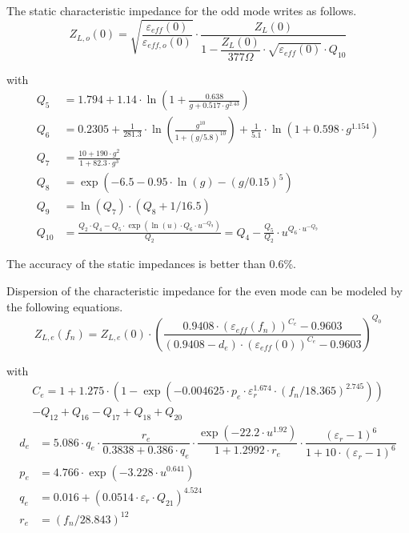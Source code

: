 \documentclass[10pt]{report}
\begin{document}
\addvspace{12pt}

The static characteristic impedance for the odd mode writes as follows.
\begin{equation}
Z_{L,o}(0) = \sqrt{\dfrac{\varepsilon_{eff}(0)}{\varepsilon_{eff,o}(0)}} \cdot
             \dfrac{Z_L(0)}{1 - \dfrac{Z_L(0)}{377\Omega} \cdot \sqrt{\varepsilon_{eff}(0)} \cdot Q_{10}}
\end{equation}

with
\begin{align}
Q_5 &= 1.794 +1.14\cdot\ln\left( 1 + \frac{0.638}{g+0.517\cdot g^{2.43}} \right)\\
Q_6 &= 0.2305 + \frac{1}{281.3}\cdot \ln\left( \frac{g^{10}}{1+\left( g/5.8\right) ^{10}} \right)
     + \frac{1}{5.1}\cdot \ln\left(1+0.598\cdot g^{1.154}\right)\\
Q_7 &= \frac{10+190\cdot g^2}{1+82.3\cdot g^3}\\
Q_8 &= \exp\left( -6.5 - 0.95\cdot\ln\left(g\right) - \left(g/0.15\right)^5 \right)\\
Q_9 &= \ln\left(Q_7\right)\cdot \left( Q_8 + 1/16.5 \right)\\
Q_{10} &= \frac{Q_2\cdot Q_4 - Q_5\cdot\exp\left( \ln\left(u\right)\cdot Q_6\cdot u^{-Q_9} \right)}{Q_2}
       = Q_4 - \frac{Q_5}{Q_2}\cdot u^{Q_6\cdot u^{-Q_9}}
\end{align}

The accuracy of the static impedances is better than 0.6\%.

\addvspace{12pt}

Dispersion of the characteristic impedance for the even mode can be
modeled by the following equations.
\begin{equation}
Z_{L,e}(f_n) = Z_{L,e}(0)\cdot \left( \dfrac{0.9408\cdot (\varepsilon_{eff}(f_n))^{C_e} - 0.9603}
                        {\left(0.9408-d_e\right)\cdot \left(\varepsilon_{eff}(0)\right)^{C_e} - 0.9603} \right) ^{Q_0}
\end{equation}

with
\begin{equation}
\begin{split}
C_e = 1 + 1.275\cdot \left( 1-\exp\left( -0.004625\cdot p_e\cdot \varepsilon_r^{1.674}\cdot
      \left( f_n/18.365 \right) ^{2.745} \right) \right)\\
      - Q_{12}+Q_{16}-Q_{17}+Q_{18}+Q_{20}
\end{split}
\end{equation}
\begin{align}
d_e &= 5.086\cdot q_e\cdot\dfrac{r_e}{0.3838+0.386\cdot q_e}\cdot
      \dfrac{\exp\left(-22.2\cdot u^{1.92}\right)}{1+1.2992\cdot r_e}\cdot
      \dfrac{(\varepsilon_r-1)^6}{1 + 10\cdot (\varepsilon_r-1)^6}\\
p_e &= 4.766\cdot \exp \left(-3.228\cdot u^{0.641}\right)\\
q_e &= 0.016 + \left(0.0514\cdot \varepsilon_r\cdot Q_{21}\right)^{4.524}\\
r_e &= \left( f_n/28.843 \right) ^{12}
\end{align}
\end{document}
